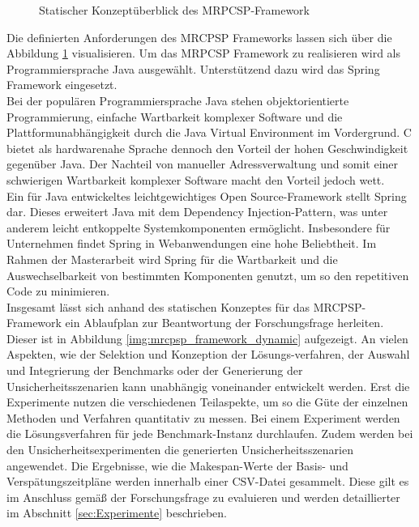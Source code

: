 \begin{figure}[H]
    \centering
    \noindent{}
    \caption{Statischer Konzeptüberblick des MRPCSP-Framework} 
    \label{img:mrcpsp_framework}
\end{figure}

Die definierten Anforderungen des MRCPSP Frameworks lassen sich über die Abbildung \ref{img:mrcpsp_framework} visualisieren. Um das MRPCSP Framework zu realisieren wird als Programmiersprache Java ausgewählt. Unterstützend dazu wird das Spring Framework eingesetzt. \\

Bei der populären Programmiersprache Java stehen objektorientierte Programmierung, einfache Wartbarkeit komplexer Software und die Plattformunabhängigkeit durch die Java Virtual Environment im Vordergrund. C bietet als hardwarenahe Sprache dennoch den Vorteil der hohen Geschwindigkeit gegenüber Java. Der Nachteil von manueller Adressverwaltung und somit einer schwierigen Wartbarkeit komplexer Software macht den Vorteil jedoch wett. \cite[vgl.][]{zang_executive_2019}\\

Ein für Java entwickeltes leichtgewichtiges Open Source-Framework stellt Spring dar. Dieses erweitert Java mit dem Dependency Injection-Pattern, was unter anderem leicht entkoppelte Systemkomponenten ermöglicht. Insbesondere für Unternehmen findet Spring in Webanwendungen eine hohe Beliebtheit. Im Rahmen der Masterarbeit wird Spring für die Wartbarkeit und die Auswechselbarkeit von bestimmten Komponenten genutzt, um so den repetitiven Code zu minimieren. \cite[vgl.][]{augsten_was_2019} \\

Insgesamt lässt sich anhand des statischen Konzeptes für das MRCPSP-Framework ein Ablaufplan zur Beantwortung der Forschungsfrage herleiten. Dieser ist in Abbildung \ref{img:mrcpsp_framework_dynamic} aufgezeigt. An vielen Aspekten, wie der Selektion und Konzeption der Lösungs-verfahren, der Auswahl und Integrierung der Benchmarks oder der Generierung der Unsicherheitsszenarien kann unabhängig voneinander entwickelt werden. Erst die Experimente nutzen die verschiedenen Teilaspekte, um so die Güte der einzelnen Methoden und Verfahren quantitativ zu messen. Bei einem Experiment werden die Lösungsverfahren für jede Benchmark-Instanz durchlaufen. Zudem werden bei den Unsicherheitsexperimenten die generierten Unsicherheitsszenarien angewendet. Die Ergebnisse, wie die Makespan-Werte der Basis- und Verspätungszeitpläne werden innerhalb einer CSV-Datei gesammelt. Diese gilt es im Anschluss gemäß der Forschungsfrage zu evaluieren und werden detaillierter im Abschnitt \ref{sec:Experimente} beschrieben. 

